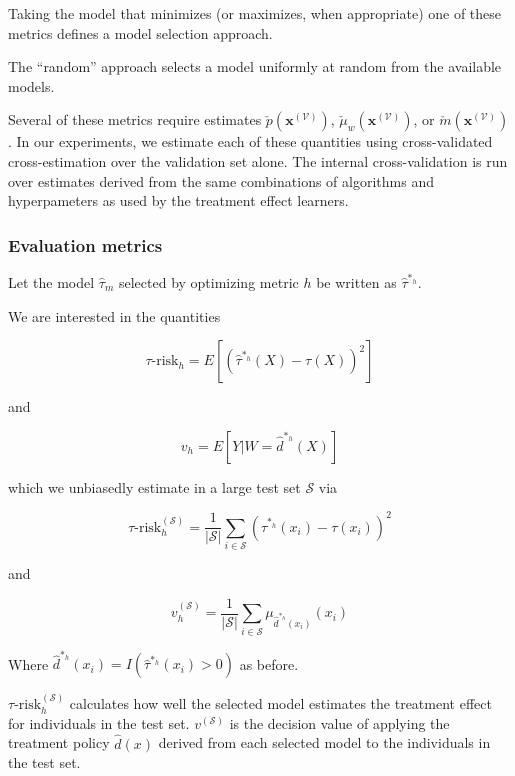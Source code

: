 Taking the model that minimizes (or maximizes, when appropriate) one of these metrics defines a model selection approach. 

The ``random'' approach selects a model uniformly at random from the available models. 

Several of these metrics require estimates $\check p(\bm x^{(\mathcal V)})$, $\check \mu_w(\bm x^{(\mathcal V)})$, or $\check m(\bm x^{(\mathcal V)})$. In our experiments, we estimate each of these quantities using cross-validated cross-estimation over the validation set alone. The internal cross-validation is run over estimates derived from the same combinations of algorithms and hyperpameters as used by the treatment effect learners. 

\subsubsection{Evaluation metrics}

Let the model $\hat\tau_m$ selected by optimizing metric $h$ be written as $\hat\tau^{*_h}$. 

We are interested in the quantities

\[
\tau\text{-risk}_h = E[ (\hat\tau^{*_h} (X) - \tau(X))^2 ]
\]

and 

\[
v_h = E[ Y| W =\hat d^{*_h} (X)]
\]

which we unbiasedly estimate in a large test set $\mathcal{S}$ via

\begin{equation}
\label{true-mse}
\tau\text{-risk}^{(\mathcal{S})}_h = \frac{1}{|\mathcal{S}|}\sum_{i \in \mathcal{S}} (\hat\tau^{*_h} (x_i) - \tau(x_i))^2
\end{equation}

and 

\begin{equation}
\label{true-value}
v^{(\mathcal{S})}_h = \frac{1}{|\mathcal{S}|}\sum_{i \in \mathcal{S}} \mu_{\hat d^{*_h}(x_i)}(x_i)
\end{equation}

Where $\hat d^{*_h}(x_i) = I(\hat\tau^{*_h}(x_i) > 0)$ as before. 

$\tau\text{-risk}_{h}^{(\mathcal{S})}$ calculates how well the selected model estimates the treatment effect for individuals in the test set. $v^{(\mathcal{S})}$ is the decision value of applying the treatment policy $\hat d(x)$ derived from each selected model to the individuals in the test set.

